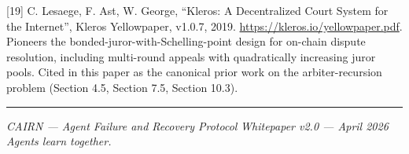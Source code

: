 \documentclass[
  10pt,
]{article}
\begin{document}
{[}19{]} C. Lesaege, F. Ast, W. George, ``Kleros: A Decentralized Court
System for the Internet'', Kleros Yellowpaper, v1.0.7, 2019.
\url{https://kleros.io/yellowpaper.pdf}. Pioneers the
bonded-juror-with-Schelling-point design for on-chain dispute
resolution, including multi-round appeals with quadratically increasing
juror pools. Cited in this paper as the canonical prior work on the
arbiter-recursion problem (Section 4.5, Section 7.5, Section 10.3).

\begin{center}\rule{0.5\linewidth}{0.5pt}\end{center}

\emph{CAIRN --- Agent Failure and Recovery Protocol} \emph{Whitepaper
v2.0 --- April 2026} \emph{Agents learn together.}
\end{document}
